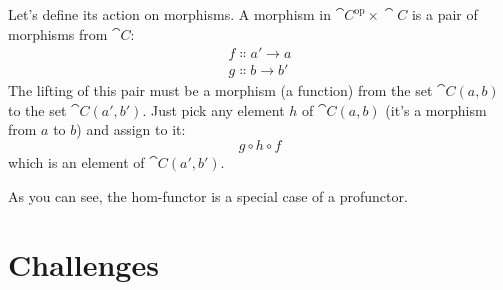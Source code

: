 Let's define its action on morphisms. A morphism in
$\cat{C}^{\mathrm{op}}\times{}\cat{C}$ is a pair of morphisms from $\cat{C}$:
\begin{gather*}
  f \Colon a' \to a \\
  g \Colon b \to b'
\end{gather*}
The lifting of this pair must be a morphism (a function) from the set
$\cat{C}(a, b)$ to the set $\cat{C}(a', b')$. Just pick
any element $h$ of $\cat{C}(a, b)$ (it's a morphism from
$a$ to $b$) and assign to it:
\[g \circ h \circ f\]
which is an element of $\cat{C}(a', b')$.

As you can see, the hom-functor is a special case of a profunctor.

\section{Challenges}

